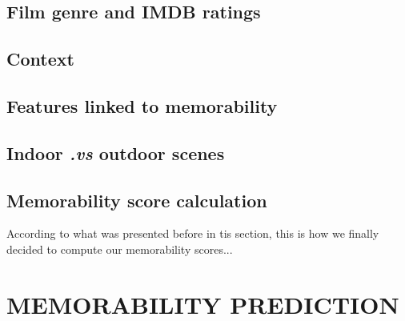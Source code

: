 \documentclass[sigconf]{acmart}
\begin{document}
\subsection{Film genre and IMDB ratings}

\subsection{Context}

\subsection{Features linked to memorability}

\subsection{Indoor \textit{.vs} outdoor scenes}




\subsection{Memorability score calculation}
According to what was presented before in tis section, this is how we finally decided to compute our memorability scores...



\section{MEMORABILITY PREDICTION} %
\end{document}
